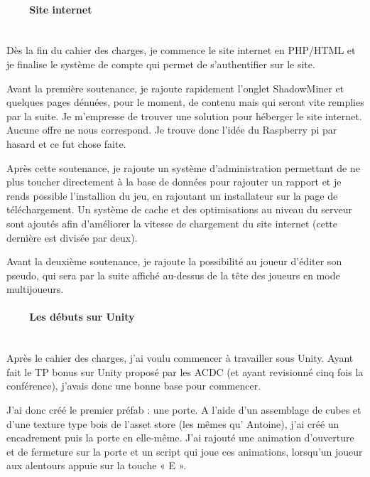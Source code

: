\documentclass[titlepage, 13px, a4paper]{report}
\begin{document}
\paragraph{~~~~Site internet} \hspace{0pt} \\
Dès la fin du cahier des charges, je commence le site internet en PHP/HTML et je finalise le système de 
compte qui permet de s’authentifier sur le site.

Avant la première soutenance, je rajoute rapidement l’onglet ShadowMiner et quelques pages dénuées, pour 
le moment, de contenu mais qui seront vite remplies par la suite. Je m’empresse de trouver une solution pour héberger le 
site internet. Aucune offre ne nous correspond. Je trouve donc l’idée du Raspberry pi par hasard et ce fut chose faite.

Après cette soutenance, je rajoute un système d’administration permettant de ne plus toucher directement 
à la base de données pour rajouter un rapport et je rends possible l’installion du jeu, en rajoutant un 
installateur sur la page de téléchargement. Un système de cache et des optimisations au niveau du serveur 
sont ajoutés afin d’améliorer la vitesse de chargement du site internet (cette dernière est divisée par deux).

Avant la deuxième soutenance, je rajoute la possibilité au joueur d’éditer son pseudo, qui sera par la suite affiché 
au-dessus de la tête des joueurs en mode multijoueurs. \\


\paragraph{~~~~Les débuts sur Unity} \hspace{0pt}     \\
Après le cahier des charges, j’ai voulu commencer à travailler sous Unity. Ayant fait le TP bonus sur 
Unity proposé par les ACDC (et ayant revisionné cinq fois la conférence), j’avais donc une bonne base pour commencer.

J’ai donc créé le premier préfab : une porte.
A l’aide d’un assemblage de cubes et d’une texture type bois de l’asset store (les mêmes qu' Antoine), 
j’ai créé un encadrement puis la porte en elle-même. J’ai rajouté une animation d’ouverture et de fermeture 
sur la porte et un script qui joue ces animations, lorsqu’un joueur aux alentours appuie sur la touche « E ». \\
\end{document}
